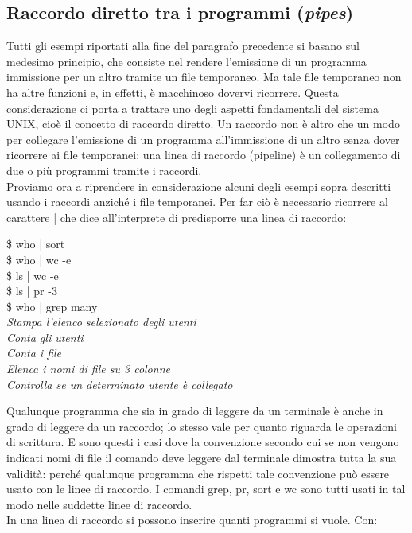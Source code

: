 \subsection{Raccordo diretto tra i programmi (\textit{pipes})}
Tutti gli esempi riportati alla fine del paragrafo precedente si basano sul medesimo
principio, che consiste nel rendere l'emissione di un programma immissione per un
altro tramite un file temporaneo. Ma tale file temporaneo non ha altre funzioni e, in
effetti, è macchinoso dovervi ricorrere. Questa considerazione ci porta a trattare uno
degli aspetti fondamentali del sistema UNIX, cioè il concetto di raccordo diretto. Un
raccordo non è altro che un modo per collegare l'emissione di un programma all'immissione di un altro senza dover ricorrere ai file temporanei; una linea di raccordo
(pipeline) è un collegamento di due o più programmi tramite i raccordi.\\
Proviamo ora a riprendere in considerazione alcuni degli esempi sopra descritti
usando i raccordi anziché i file temporanei. Per far ciò è necessario ricorrere al carattere | che dice all'interprete di predisporre una linea di raccordo:
\begin{multicols}{2}
	\$ who | sort\\
	\$ who | wc -e\\
	\$ ls | wc -e \\
	\$ ls | pr -3\\
	\$ who | grep many \\
	{\it Stampa l'elenco selezionato degli utenti\\
		Conta gli utenti\\
		Conta i file\\
		Elenca i nomi di file su 3 colonne\\
		Controlla se un determinato utente è collegato}
\end{multicols}
Qualunque programma che sia in grado di leggere da un terminale è anche in grado di
leggere da un raccordo; lo stesso vale per quanto riguarda le operazioni di scrittura. E
sono questi i casi dove la convenzione secondo cui se non vengono indicati nomi di
file il comando deve leggere dal terminale dimostra tutta la sua validità: perché qualunque programma che rispetti tale convenzione può essere usato con le linee di raccordo. I comandi grep, pr, sort e wc sono tutti usati in tal modo nelle suddette linee di
raccordo.\\
In una linea di raccordo si possono inserire quanti programmi si vuole. Con:\\\\
